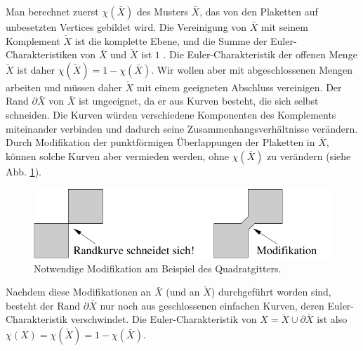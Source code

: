Man berechnet zuerst $\chi(\bar{X})$ des Musters $\bar{X}$, das von den Plaketten auf unbesetzten Vertices gebildet wird. Die Vereinigung von $\bar{X}$ mit seinem Komplement $\check{X}$ ist die komplette Ebene, und die Summe der Euler-Charakteristiken von $\bar{X}$ und $\check{X}$ ist $1$ \cite{Saskin:89}. Die Euler-Charakteristik der offenen Menge $\check{X}$ ist daher $\chi(\check{X})=1-\chi(\bar{X})$. Wir wollen aber mit abgeschlossenen Mengen arbeiten und m\"ussen daher $\check{X}$ mit einem geeigneten Abschluss vereinigen. Der Rand $\partial \bar{X}$ von $\bar{X}$ ist ungeeignet, da er aus Kurven besteht, die sich selbst schneiden. Die Kurven w\"urden verschiedene Komponenten des Komplements miteinander verbinden und dadurch seine Zusammenhangsverh\"altnisse ver\"andern. Durch Modifikation der punktf\"ormigen \"Uberlappungen der Plaketten in $\bar{X}$, k\"onnen solche Kurven aber vermieden werden, ohne $\chi(\bar{X})$ zu ver\"andern (siehe Abb. \ref{fig:mod}).
\begin{figure}[htbp]
  \centering
  \includegraphics{./Euler-figs/mod}
  \caption{Notwendige Modifikation am Beispiel des Quadratgitters.}
  \label{fig:mod}
\end{figure}
Nachdem diese Modifikationen an $\bar{X}$ (und an $\check{X}$) durchgef\"uhrt worden sind, besteht der Rand $\partial \bar{X}$ nur noch aus geschlossenen einfachen Kurven, deren Euler-Charakteristik verschwindet. Die Euler-Charakteristik von $X=\check{X}\cup\partial \bar{X}$ ist also $\chi(X)=\chi(\check{X})=1-\chi(\bar{X})$.
